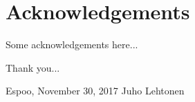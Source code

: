 \documentclass[12pt,a4paper,oneside,pdftex]{report}
\newcommand{\DATE}{November 30, 2017}
\newcommand{\AUTHOR}{Juho Lehtonen}
\begin{document}

\chapter*{Acknowledgements}

Some acknowledgements here...

Thank you...
\vskip 10mm

\noindent Espoo, \DATE
\vskip 5mm
\noindent\AUTHOR

\cleardoublepage


\cleardoublepage
\tableofcontents



\label{pages-prelude}
\cleardoublepage

\startfirstchapter
\end{document}
